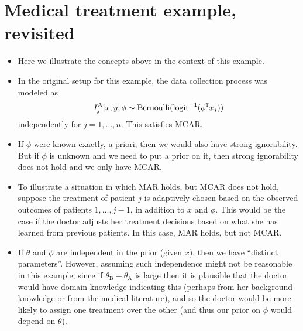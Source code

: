 \documentclass[12pt]{article}
\begin{document}
\section{Medical treatment example, revisited}

\begin{itemize}
\item Here we illustrate the concepts above in the context of this example.
\item In the original setup for this example, the data collection process was modeled as
$$ I_j^\text{A} | x,y,\phi \sim \operatorname*{Bernoulli}(\mathrm{logit}^{-1}(\phi^{\mathtt{T}} x_j)) $$
independently for $j = 1,\ldots,n$. This satisfies MCAR.
\item If $\phi$ were known exactly, a priori, then we would also have strong ignorability. But if $\phi$ is unknown and we need to put a prior on it, then strong ignorability does not hold and we only have MCAR.
\item To illustrate a situation in which MAR holds, but MCAR does not hold, suppose the treatment of patient $j$ is adaptively chosen based on the observed outcomes of patients $1,\ldots,j-1$, in addition to $x$ and $\phi$. This would be the case if the doctor adjusts her treatment decisions based on what she has learned from previous patients. In this case, MAR holds, but not MCAR.
\item If $\theta$ and $\phi$ are independent in the prior (given $x$), then we have ``distinct parameters''. However, assuming such independence might not be reasonable in this example, since if $\theta_\text{B} - \theta_\text{A}$ is large then it is plausible that the doctor would have domain knowledge indicating this (perhaps from her background knowledge or from the medical literature), and so the doctor would be more likely to assign one treatment over the other (and thus our prior on $\phi$ would depend on $\theta$). 
\end{itemize}
\end{document}

